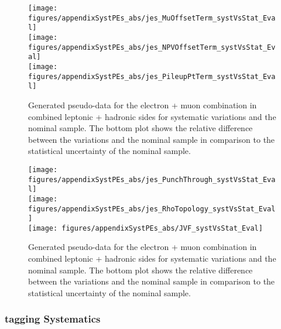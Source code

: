 \begin{figure}[!hb]
\begin{center}
        \texttt{[image: figures/appendixSystPEs\_abs/jes\_MuOffsetTerm\_systVsStat\_Eval]}\\
        \texttt{[image: figures/appendixSystPEs\_abs/jes\_NPVOffsetTerm\_systVsStat\_Eval]}\\
        \texttt{[image: figures/appendixSystPEs\_abs/jes\_PileupPtTerm\_systVsStat\_Eval]}
\caption{Generated pseudo-data for the electron + muon combination in combined leptonic + hadronic sides for systematic variations and the nominal \ttbar sample. The bottom plot shows the relative difference between the variations and the nominal sample in comparison to the statistical uncertainty of the nominal sample.}   
\label{fig:systematicVar_lephad_JES_4_2}
\end{center}
\end{figure}
\begin{figure}[!hb]
\begin{center}
        \texttt{[image: figures/appendixSystPEs\_abs/jes\_PunchThrough\_systVsStat\_Eval]}\\
        \texttt{[image: figures/appendixSystPEs\_abs/jes\_RhoTopology\_systVsStat\_Eval]} \\
        \texttt{[image: figures/appendixSystPEs\_abs/JVF\_systVsStat\_Eval]}

\caption{Generated pseudo-data for the electron + muon combination in combined leptonic + hadronic sides for systematic variations and the nominal \ttbar sample. The bottom plot shows the relative difference between the variations and the nominal sample in comparison to the statistical uncertainty of the nominal sample.}   
\label{fig:systematicVar_lephad_JES_5}
\end{center}
\end{figure}

\clearpage
\subsubsection{\bt tagging Systematics}

